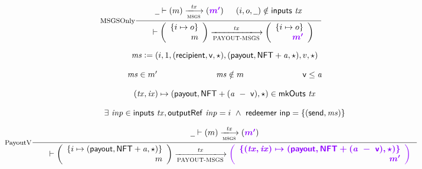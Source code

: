 \begin{equation}
  \inference[MSGSOnly]
  { \\
    \wcard \vdash
    (m)
    \trans{msgs}{\var{tx}}
    (\varUpdate{m'})  &
  (i, o, \wcard) \notin \inputs~\var{tx}\\
  }
  {
  \begin{array}{l}
    \\
  \end{array}
    \vdash
    \left(
    \begin{array}{r}
      \{i \mapsto o\} \\
      m
    \end{array}
    \right)
    \trans{PAYOUT-MSGS}{\var{tx}}
    \left(
    \begin{array}{r}
      \{i \mapsto o\} \\
       \varUpdate{m'}
    \end{array}
    \right) \\
  }
\end{equation}
\nextdef
\begin{equation}
  \inference[PayoutV]
  {~\\
  \var{ms} \leteq (i, 1, (\fun{recipient}, \fun{v}, \emptytype), (\fun{payout}, \fun{NFT} + \var{a}, \emptytype), v, \emptytype)  \\~\\
  \var{ms} \in m' & \var{ms} \notin m &
  \fun{v} \leq \var{a} \\~~\\
  (\var{tx}, \var{ix}) \mapsto (\fun{payout}, \fun{NFT} + (\var{a}~-~\fun{v}), \emptytype) \in \fun{mkOuts}~\var{tx} \\~\\
  \exists~\var{inp} \in \inputs~\var{tx}, \outputref~\var{inp} = i~\wedge~\redeemer~\fun{inp} = \{(\send, \var{ms})\}
  \\~\\
    \wcard \vdash
    (m)
    \trans{msgs}{\var{tx}}
    (\varUpdate{m'}) \\
  }
  {
  \begin{array}{l}
    \\
  \end{array}
    \vdash
    \left(
    \begin{array}{r}
      \{i \mapsto (\fun{payout}, \fun{NFT} + \var{a}, \emptytype)\} \\
      m
    \end{array}
    \right)
    \trans{PAYOUT-MSGS}{\var{tx}}
    \varUpdate{\left(
    \begin{array}{r}
      \{(\var{tx}, \var{ix}) \mapsto (\fun{payout}, \fun{NFT} + (\var{a}~-~\fun{v}), \emptytype)\} \\
       m'
    \end{array}
    \right) } \\
  }
\end{equation}

